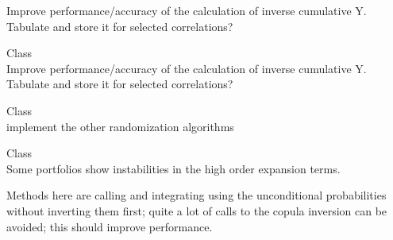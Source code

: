 \begin{DoxyRefList}
\label{todo__todo000017}%
%
Improve performance/accuracy of the calculation of inverse cumulative Y. Tabulate and store it for selected correlations?  
\item[Class \doxylink{class_quant_lib_1_1_one_factor_student_gaussian_copula}{Quant\+Lib\+::One\+Factor\+Student\+Gaussian\+Copula} ]\hfill \\
\label{todo__todo000019}%
%
Improve performance/accuracy of the calculation of inverse cumulative Y. Tabulate and store it for selected correlations?  
\item[Class \doxylink{class_quant_lib_1_1_randomized_l_d_s}{Quant\+Lib\+::Randomized\+LDS\texorpdfstring{$<$}{<} LDS, PRS \texorpdfstring{$>$}{>}} ]\hfill \\
\label{todo__todo000050}%
%
implement the other randomization algorithms 
\item[Class \doxylink{class_quant_lib_1_1_saddle_point_loss_model}{Quant\+Lib\+::Saddle\+Point\+Loss\+Model\texorpdfstring{$<$}{<} CP \texorpdfstring{$>$}{>}} ]\hfill \\
\label{todo__todo000020}%
%
Some portfolios show instabilities in the high order expansion terms. 



Methods here are calling and integrating using the unconditional probabilities without inverting them first; quite a lot of calls to the copula inversion can be avoided; this should improve performance. 




\end{DoxyRefList}
